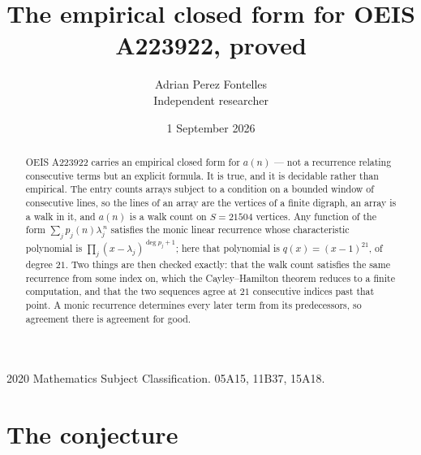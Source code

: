 \documentclass[11pt,a4paper]{article}
\title{The empirical closed form for OEIS A223922, proved}
\author{Adrian Perez Fontelles\\ \small Independent researcher}
\date{1 September 2026}
\theoremstyle{plain}
\theoremstyle{definition}
\begin{document}
\maketitle

\begin{abstract}
OEIS A223922 carries an empirical closed form for $a(n)$ --- not a recurrence relating
consecutive terms but an explicit formula. It is true, and it is decidable rather than
empirical. The entry counts arrays subject to a condition on a bounded window of consecutive lines, so the lines of an array are the
vertices of a finite digraph, an array is a walk in it, and $a(n)$ is a walk count on
$S=21504$ vertices. Any function of the form $\sum_j p_j(n)\lambda_j^{\,n}$ satisfies the
monic linear recurrence whose characteristic polynomial is
$\prod_j(x-\lambda_j)^{\deg p_j+1}$; here that polynomial is $q(x)=(x-1)^{21}$, of degree
$21$. Two things are then checked exactly: that the walk count satisfies the same
recurrence from some index on, which the Cayley--Hamilton theorem reduces to a finite
computation, and that the two sequences agree at $21$ consecutive indices past that
point. A monic recurrence determines every later term from its predecessors, so agreement
there is agreement for good.
\end{abstract}

\noindent\small 2020 Mathematics Subject Classification. 05A15, 11B37, 15A18.\normalsize

\section{The conjecture}
\end{document}
